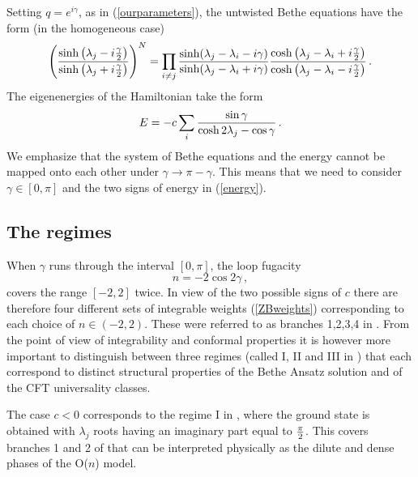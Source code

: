 \documentclass[11pt]{article}
\begin{document}
Setting $q=e^{i\gamma}$, as in (\ref{ourparameters}), the untwisted Bethe equations have the form (in the homogeneous case)
%
\begin{equation}
\left( {\sinh\left(\lambda_j-i{\gamma\over 2}\right)\over  
\sinh\left(\lambda_j+i{\gamma\over 2}\right)} \right)^N=
\prod_{i\neq j} {\sinh(\lambda_j-\lambda_i-i\gamma)\over  \sinh
(\lambda_j-\lambda_i+i\gamma)}{\cosh\left(\lambda_j-\lambda_i+i{\gamma\over 2}\right)\over  
\cosh\left(\lambda_j-\lambda_i-i{\gamma\over 2}\right)} \,. \label{basiceqs}
\end{equation}
%
The eigenenergies of the Hamiltonian  take the form
%
\begin{equation}
E=-c\sum_i {\sin\gamma\over \cosh 2\lambda_j-\cos\gamma} \,. \label{energy}
\end{equation}
%
We emphasize that the system of Bethe equations and the energy cannot be mapped onto each other under $\gamma\to \pi-\gamma$. This means that we need to consider $\gamma\in [0,\pi]$ and the two signs of energy in (\ref{energy}). 

\subsection{The regimes}
\label{sec:regimes}

When $\gamma$ runs through the interval $[0,\pi]$, the loop fugacity
%
\begin{equation}
 n = -2 \cos 2 \gamma \,,
\end{equation}
%
covers the range $[-2,2]$ twice. In view of the two possible signs of $c$ there are therefore four different sets of integrable weights (\ref{ZBweights}) corresponding to each choice of $n \in (-2,2)$. These were referred to as branches 1,2,3,4 in \cite{BloteNienhuis89}. From the point of view of integrability and conformal properties it is however more important to distinguish between three regimes (called I, II and III in \cite{Nienhuis}) that each correspond to distinct structural properties of the Bethe Ansatz solution and of the CFT universality classes.

The case $c<0$ corresponds to the regime I in \cite{Nienhuis}, where the ground state is obtained with  $\lambda_j$ roots having an imaginary part equal to ${\pi\over 2}$. This covers branches 1 and 2 of \cite{BloteNienhuis89} that can be interpreted physically as the dilute and dense phases of the O($n$) model.
 
\end{document}
